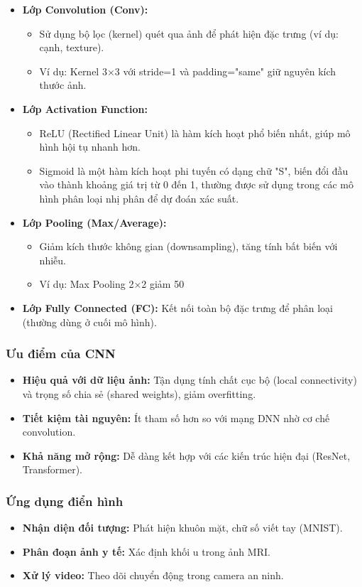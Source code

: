 \begin{itemize}
    \item \textbf{Lớp Convolution (Conv):}
    \begin{itemize}
        \item Sử dụng bộ lọc (kernel) quét qua ảnh để phát hiện đặc trưng (ví dụ: cạnh, texture).
        \item Ví dụ: Kernel 3×3 với stride=1 và padding="same" giữ nguyên kích thước ảnh.
    \end{itemize}
    \item \textbf{Lớp Activation Function:} 
    \begin{itemize}
        \item ReLU (Rectified Linear Unit) là hàm kích hoạt phổ biến nhất, giúp mô hình hội tụ nhanh hơn.
        \item Sigmoid là một hàm kích hoạt phi tuyến có dạng chữ "S", biến đổi đầu vào thành khoảng giá trị từ 0 đến 1, thường được sử dụng trong các mô hình phân loại nhị phân để dự đoán xác suất.
    \end{itemize}
    \item \textbf{Lớp Pooling (Max/Average):}
    \begin{itemize}
        \item Giảm kích thước không gian (downsampling), tăng tính bất biến với nhiễu.
        \item Ví dụ: Max Pooling 2×2 giảm 50%
    \end{itemize}
    \item \textbf{Lớp Fully Connected (FC):} Kết nối toàn bộ đặc trưng để phân loại (thường dùng ở cuối mô hình).
\end{itemize}
\subsubsection{Ưu điểm của CNN}
\begin{itemize}
    \item \textbf{Hiệu quả với dữ liệu ảnh:} Tận dụng tính chất cục bộ (local connectivity) và trọng số chia sẻ (shared weights), giảm overfitting.
    \item \textbf{Tiết kiệm tài nguyên:} Ít tham số hơn so với mạng DNN nhờ cơ chế convolution.
    \item \textbf{Khả năng mở rộng:} Dễ dàng kết hợp với các kiến trúc hiện đại (ResNet, Transformer).
\end{itemize}
\subsubsection{Ứng dụng điển hình}
\begin{itemize}
    \item \textbf{Nhận diện đối tượng:} Phát hiện khuôn mặt, chữ số viết tay (MNIST).
    \item \textbf{Phân đoạn ảnh y tế:} Xác định khối u trong ảnh MRI.
    \item \textbf{Xử lý video:} Theo dõi chuyển động trong camera an ninh.
\end{itemize}
